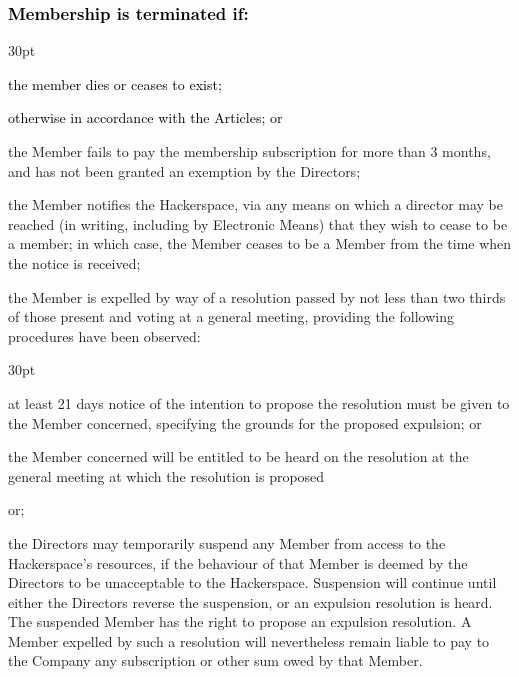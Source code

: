 \documentclass[12pt]{article}
\def\clauseindent{30pt}
\def\fakecolour{black}
\newenvironment{subindentpara}{\raggedright\begin{adjustwidth}{\clauseindent}{}\begin{hanginglist}}{\end{hanginglist}\end{adjustwidth}}
\begin{document}
\subsubsection[Specifics of Termination of Membership]{\textcolor{\fakecolour}{Membership is terminated if:}}
\begin{subindentpara}
    \item \textcolor{\fakecolour}{the member dies or ceases to exist;}
    \item \textcolor{\fakecolour}{otherwise in accordance with the Articles; or}
    \item the Member fails to pay the membership subscription for more than 3 months, and has not been granted an exemption by the Directors;
    \item the Member notifies the Hackerspace, via any means on which a director may be reached (in writing, including by Electronic Means) that they wish to cease to be a member; in which case, the Member ceases to be a Member from the time when the notice is received;
    \item the Member is expelled by way of a resolution passed by not less than two thirds of those present and voting at a general meeting, providing the following procedures have been observed: 
    \begin{subindentpara} %
        \item at least 21 days notice of the intention to propose the resolution must be given to the Member concerned,  specifying the grounds for the proposed expulsion; or
        \item the Member concerned will be entitled to be heard on the resolution at the general meeting at which the resolution is proposed
    \end{subindentpara}
    \item or;
    \item the Directors may temporarily suspend any Member from access to the Hackerspace's resources, if the behaviour of that Member is deemed by the Directors to be unacceptable to the Hackerspace. Suspension will continue until either the Directors reverse the suspension, or an expulsion resolution is heard. The suspended Member has the right to propose an expulsion resolution. A Member expelled by such a resolution will nevertheless remain liable to pay to the Company any subscription or other sum owed by that Member.
\end{subindentpara}
\end{document}
